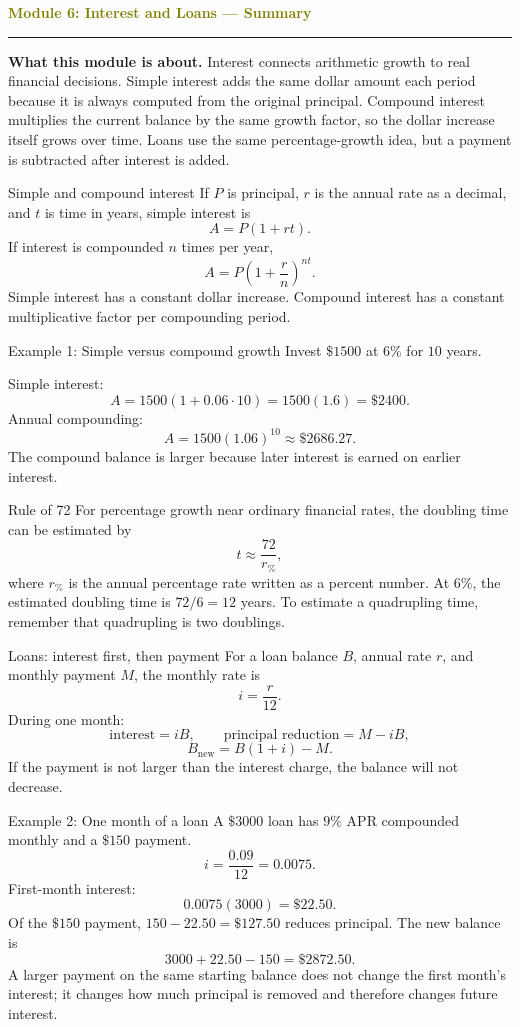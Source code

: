 \documentclass[11pt]{article}
\newcommand{\summaryhead}[2]{%
  \clearpage
  {\Large\bfseries\textcolor{olive}{Module #1: #2 — Summary}}\par
  \vspace{2pt}\textcolor{gold}{\rule{\linewidth}{1.2pt}}\par\smallskip
}
\begin{document}
\summaryhead{6}{Interest and Loans}

\textbf{What this module is about.} Interest connects arithmetic growth to real financial decisions. Simple interest adds the same dollar amount each period because it is always computed from the original principal. Compound interest multiplies the current balance by the same growth factor, so the dollar increase itself grows over time. Loans use the same percentage-growth idea, but a payment is subtracted after interest is added.

\begin{keybox}{Simple and compound interest}
If \(P\) is principal, \(r\) is the annual rate as a decimal, and \(t\) is time in years, simple interest is
\[
A=P(1+rt).
\]
If interest is compounded \(n\) times per year,
\[
A=P\left(1+\frac rn\right)^{nt}.
\]
Simple interest has a constant dollar increase. Compound interest has a constant multiplicative factor per compounding period.
\end{keybox}

\begin{examplebox}{Example 1: Simple versus compound growth}
Invest \(\$1500\) at \(6\%\) for \(10\) years.

Simple interest:
\[
A=1500(1+0.06\cdot10)=1500(1.6)=\$2400.
\]
Annual compounding:
\[
A=1500(1.06)^{10}\approx\$2686.27.
\]
The compound balance is larger because later interest is earned on earlier interest.
\end{examplebox}

\begin{keybox}{Rule of 72}
For percentage growth near ordinary financial rates, the doubling time can be estimated by
\[
t\approx\frac{72}{r_{\%}},
\]
where \(r_{\%}\) is the annual percentage rate written as a percent number. At \(6\%\), the estimated doubling time is \(72/6=12\) years. To estimate a quadrupling time, remember that quadrupling is two doublings.
\end{keybox}

\begin{keybox}{Loans: interest first, then payment}
For a loan balance \(B\), annual rate \(r\), and monthly payment \(M\), the monthly rate is
\[
i=\frac r{12}.
\]
During one month:
\[
\text{interest}=iB,
\qquad
\text{principal reduction}=M-iB,
\]
\[
B_{\text{new}}=B(1+i)-M.
\]
If the payment is not larger than the interest charge, the balance will not decrease.
\end{keybox}

\begin{examplebox}{Example 2: One month of a loan}
A \(\$3000\) loan has \(9\%\) APR compounded monthly and a \(\$150\) payment.
\[
i=\frac{0.09}{12}=0.0075.
\]
First-month interest:
\[
0.0075(3000)=\$22.50.
\]
Of the \(\$150\) payment, \(150-22.50=\$127.50\) reduces principal. The new balance is
\[
3000+22.50-150=\$2872.50.
\]
A larger payment on the same starting balance does not change the first month's interest; it changes how much principal is removed and therefore changes future interest.
\end{examplebox}
\end{document}
